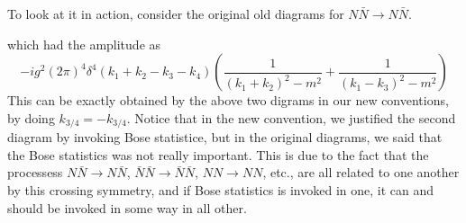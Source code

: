 \documentclass[11pt]{article}
\numberwithin{equation}{section}
\begin{document}
    To look at it in action, consider the original old diagrams for \(N\bar{N} \to N \bar N\).
    \begin{figure}[h]
        \centering
    \end{figure}
    which had the amplitude as
    \begin{equation*}
        -ig^2(2\pi)^4\delta^4(k_1 + k_2 - k_3 - k_4) \left(  \frac{1}{(k_1 + k_2)^2 - m^2} +    \frac{1}{(k_1 
    - k_3)^2 - m^2}    \right)
    \end{equation*}
    This can be exactly obtained by the above two digrams in our new conventions, by doing \(k_{3/4} = -k_{3/4}\). Notice that in the new convention, we justified the second diagram by invoking Bose statistice, but in the original diagrams, we said that the Bose statistics was not really important. This is due to the fact that the processess \(N\bar{N}\to N\bar N\),  \(\bar N\bar{N}\to \bar N\bar N\), \(NN\to NN\), etc., are all related to one another by this crossing symmetry, and if Bose statistics is invoked in one, it can and should be invoked in some way in all other.\\
\end{document}
